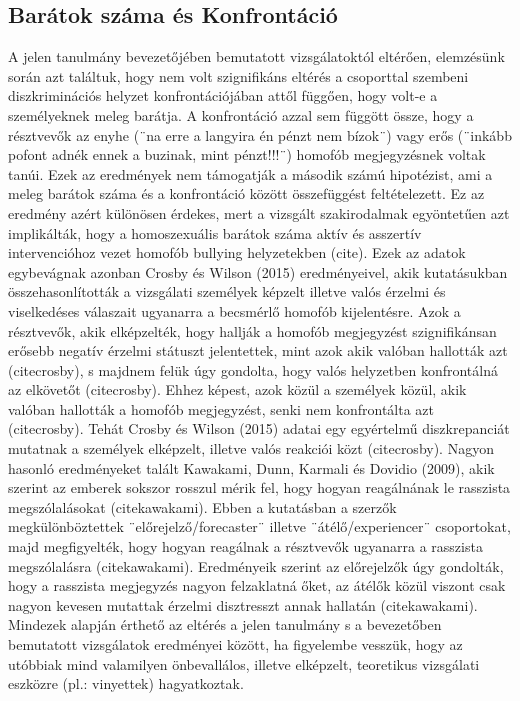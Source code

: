 \subsection{Barátok száma és Konfrontáció}
A jelen tanulmány bevezetőjében bemutatott vizsgálatoktól eltérően, elemzésünk során azt találtuk, hogy nem volt szignifikáns eltérés a csoporttal szembeni diszkriminációs helyzet konfrontációjában attől függően, hogy volt-e a személyeknek meleg barátja. A konfrontáció azzal sem függött össze, hogy a résztvevők az enyhe (¨na erre a langyira én pénzt nem bízok¨) vagy erős (¨inkább pofont adnék ennek a buzinak, mint pénzt!!!¨) homofób megjegyzésnek voltak tanúi. Ezek az eredmények nem támogatják a második számú hipotézist, ami a meleg barátok száma és a konfrontáció között összefüggést feltételezett. Ez az eredmény azért különösen érdekes, mert a vizsgált szakirodalmak egyöntetűen azt implikálták, hogy a homoszexuális barátok száma aktív és asszertív intervencióhoz vezet homofób bullying helyzetekben (cite). Ezek az adatok egybevágnak azonban Crosby és Wilson (2015) eredményeivel, akik kutatásukban összehasonlították a vizsgálati személyek képzelt illetve valós érzelmi és viselkedéses válaszait ugyanarra a becsmérlő homofób kijelentésre. Azok a résztvevők, akik elképzelték, hogy hallják a homofób megjegyzést szignifikánsan erősebb negatív érzelmi státuszt jelentettek, mint azok akik valóban hallották azt (citecrosby), s majdnem felük úgy gondolta, hogy valós helyzetben konfrontálná az elkövetőt (citecrosby). Ehhez képest, azok közül a személyek közül, akik valóban hallották a homofób megjegyzést, senki nem konfrontálta azt (citecrosby). Tehát Crosby és Wilson (2015) adatai egy egyértelmű diszkrepanciát mutatnak a személyek elképzelt, illetve valós reakciói közt (citecrosby). Nagyon hasonló eredményeket talált Kawakami, Dunn, Karmali és Dovidio (2009), akik szerint az emberek sokszor rosszul mérik fel, hogy hogyan reagálnának le rasszista megszólalásokat (citekawakami). Ebben a kutatásban a szerzők megkülönböztettek ¨előrejelző/forecaster¨ illetve ¨átélő/experiencer¨ csoportokat, majd megfigyelték, hogy hogyan reagálnak a résztvevők ugyanarra a rasszista megszólalásra (citekawakami). Eredményeik szerint az előrejelzők úgy gondolták, hogy a rasszista megjegyzés nagyon felzaklatná őket, az átélők közül viszont csak nagyon kevesen mutattak érzelmi disztresszt annak hallatán (citekawakami).
Mindezek alapján érthető az eltérés a jelen tanulmány s a bevezetőben bemutatott vizsgálatok eredményei között, ha figyelembe vesszük, hogy az utóbbiak mind valamilyen önbevallálos, illetve elképzelt, teoretikus vizsgálati eszközre (pl.: vinyettek) hagyatkoztak. 

